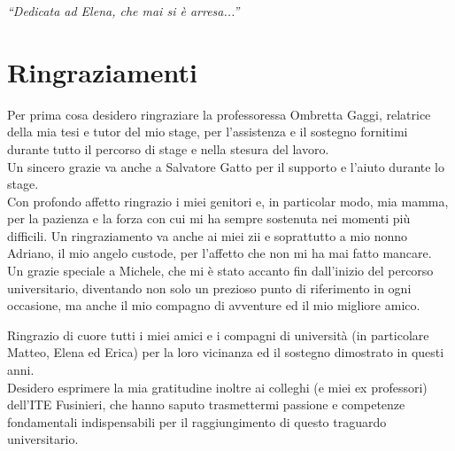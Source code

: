 \cleardoublepage
{}
{}

\begin{flushright}{
    \slshape
    ``Dedicata ad Elena, che mai si è arresa...''} \\
\end{flushright}
\vspace{2.5cm}
\begingroup
\let\clearpage\relax
\let\cleardoublepage\relax

\chapter*{Ringraziamenti}
\noindent\begin{small}Per prima cosa desidero ringraziare la professoressa Ombretta Gaggi, relatrice della mia tesi e tutor del mio stage, per l’assistenza e il sostegno fornitimi durante tutto il percorso di stage e nella stesura del lavoro.\\
Un sincero grazie va anche a Salvatore Gatto per il supporto e l’aiuto durante lo stage.\\

\noindent Con profondo affetto ringrazio i miei genitori e, in particolar modo, mia mamma, per la pazienza e la forza con cui mi ha sempre sostenuta nei momenti più difficili. Un ringraziamento va anche ai miei zii e soprattutto a mio nonno Adriano, il mio angelo custode, per l’affetto che non mi ha mai fatto mancare.\\

\noindent Un grazie speciale a Michele, che mi è stato accanto fin dall’inizio del percorso universitario, diventando non solo un prezioso punto di riferimento in ogni occasione, ma anche il mio compagno di avventure ed il mio migliore amico.

\noindent Ringrazio di cuore tutti i miei amici e i compagni di università (in particolare Matteo, Elena ed Erica) per la loro vicinanza ed il sostegno dimostrato in questi anni.\\

\noindent Desidero esprimere la mia gratitudine inoltre ai colleghi (e miei ex professori) dell’ITE Fusinieri, che hanno saputo trasmettermi passione e competenze fondamentali indispensabili per il raggiungimento di questo traguardo universitario.\\
\end{small}
\vspace{0.75cm}

\noindent{\myLocation, \myTime}
\hfill \textit{\myName}

\endgroup